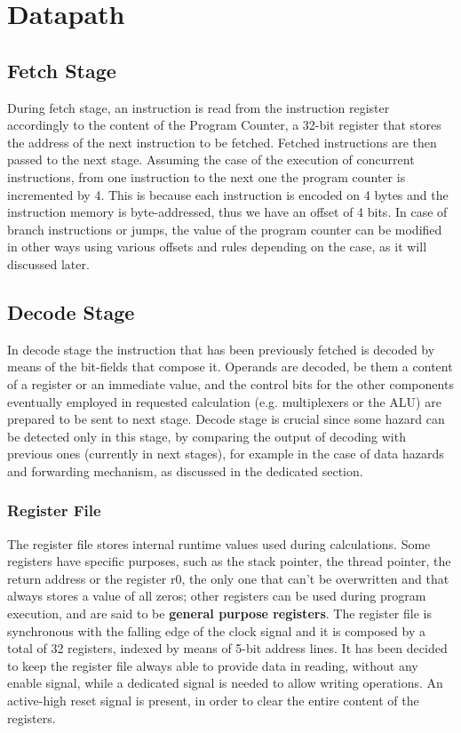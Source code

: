 %
 
\chapter{Datapath}
\label{cha2}
\section{Fetch Stage}
During fetch stage, an instruction is read from the instruction register accordingly to the content of the Program Counter, a 32-bit register that stores the address 
of the next instruction to be fetched. Fetched instructions are then passed to the next stage.
Assuming the case of the execution of concurrent instructions, from one instruction to the next one the program counter is incremented by 4. This is because each instruction 
is encoded on 4 bytes and the instruction memory is byte-addressed, thus we have an offset of 4 bits.
In case of branch instructions or jumps, the value of the program counter can be modified in other ways using various offsets and rules depending on the case, 
as it will discussed later.

\section{Decode Stage}

In decode stage the instruction that has been previously fetched is decoded by means of the bit-fields that compose it.
Operands are decoded, be them a content of a register or an immediate value, and the control bits for the other components eventually employed in requested calculation 
(e.g. multiplexers or the ALU) are prepared to be sent to next stage.
Decode stage is crucial since some hazard can be detected only in this stage, by comparing the output of decoding with previous ones (currently in next stages), 
for example in the case of data hazards and forwarding mechanism, as discussed in the dedicated section.

\subsection{Register File}

The register file stores internal runtime values used during calculations.
Some registers have specific purposes, such as the stack pointer, the thread pointer, the return address or the register r0, the only one that can't be overwritten 
and that always stores a value of all zeros; other registers can be used during program execution, and are said to be \textbf{general purpose registers}.
The register file is synchronous with the falling edge of the clock signal and it is composed by a total of 32 registers, indexed by means of 5-bit address lines.
It has been decided to keep the register file always able to provide data in reading, without any enable signal, while a dedicated signal is needed to allow writing operations.
An active-high reset signal is present, in order to clear the entire content of the registers.

